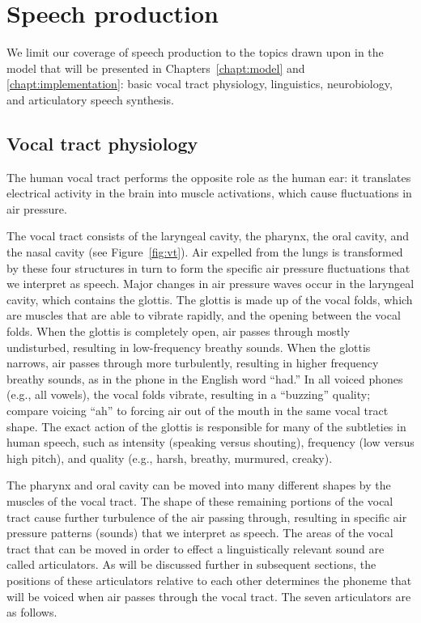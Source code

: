 \section{Speech production}

We limit our coverage
of speech production
to the topics drawn upon
in the model that will be presented
in Chapters~\ref{chapt:model}
and \ref{chapt:implementation}:
basic vocal tract physiology,
linguistics, neurobiology,
and articulatory speech synthesis.

\subsection{Vocal tract physiology}

The human vocal tract performs
the opposite role
as the human ear:
it translates electrical activity in the brain
into muscle activations,
which cause fluctuations in air pressure.


The vocal tract consists of
the laryngeal cavity,
the pharynx, the oral cavity,
and the nasal cavity
(see Figure~\ref{fig:vt}).
Air expelled from the lungs
is transformed
by these four structures
in turn to form the
specific air pressure fluctuations
that we interpret as speech.
Major changes in air pressure waves
occur in the laryngeal cavity,
which contains the glottis.
The glottis is made up of
the vocal folds,
which are muscles that are able to vibrate rapidly,
and the opening between the vocal folds.
When the glottis is completely open,
air passes through mostly undisturbed,
resulting in low-frequency breathy sounds.
When the glottis narrows,
air passes through more turbulently,
resulting in higher frequency breathy sounds,
as in the phone \ipa{[h]}
in the English word ``had.''
In all voiced phones (e.g., all vowels),
the vocal folds vibrate,
resulting in a ``buzzing'' quality;
compare voicing ``ah'' to
forcing air out of the mouth
in the same vocal tract shape.
The exact action of the glottis
is responsible for many
of the subtleties in human speech,
such as intensity (speaking versus shouting),
frequency (low versus high pitch),
and quality (e.g., harsh, breathy, murmured, creaky).

The pharynx and oral cavity
can be moved into many different shapes
by the muscles of the vocal tract.
The shape of these remaining portions
of the vocal tract cause further turbulence
of the air passing through,
resulting in specific air pressure patterns (sounds)
that we interpret as speech.
The areas of the vocal tract
that can be moved in order to
effect a linguistically relevant sound
are called articulators.
As will be discussed further
in subsequent sections,
the positions of these articulators
relative to each other
determines the phoneme
that will be voiced
when air passes through
the vocal tract.
The seven articulators are
as follows.

